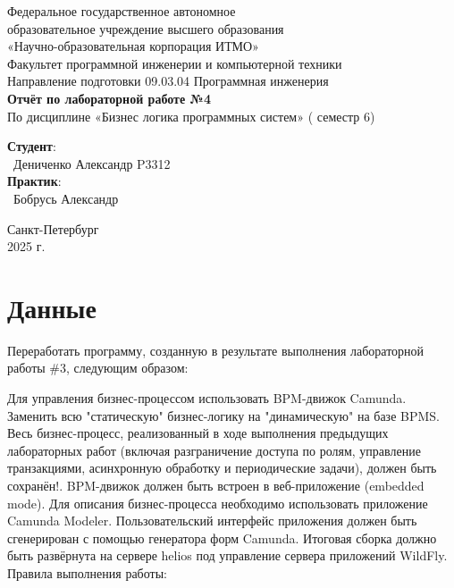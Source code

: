 \documentclass{article}
\begin{document}
\begin{center}
    \Large
    Федеральное государственное автономное \\
    образовательное учреждение высшего образования \\ 
    «Научно-образовательная корпорация ИТМО»\\
    \vspace{0.5cm}
    \large
    Факультет программной инженерии и компьютерной техники \\
    Направление подготовки 09.03.04 Программная инженерия \\
    \vspace{1cm}
    \Large
    \textbf{Отчёт по лабораторной работе №4} \\
        По дисциплине «Бизнес логика программных систем» ( семестр 6)\\
    \large
    \vspace{8cm}

    \begin{minipage}{.33\textwidth}
    \end{minipage}
    \hfill
    \begin{minipage}{.4\textwidth}
    
        \textbf{Студент}: \vspace{.1cm} \\
        \ Дениченко Александр P3312\\
        \textbf{Практик}:  \\
        \ Бобрусь Александр
    \end{minipage}
    \vfill
Санкт-Петербург\\ 2025 г.
\end{center}
\pagestyle{empty}
\newpage
\pagestyle{plain}

\section*{Данные}


Переработать программу, созданную в результате выполнения лабораторной работы \#3, следующим образом:

Для управления бизнес-процессом использовать BPM-движок Camunda.
Заменить всю "статическую" бизнес-логику на "динамическую" на базе BPMS. Весь бизнес-процесс, реализованный в ходе выполнения предыдущих лабораторных работ (включая разграничение доступа по ролям, управление транзакциями, асинхронную обработку и периодические задачи), должен быть сохранён!.
BPM-движок должен быть встроен в веб-приложение (embedded mode).
Для описания бизнес-процесса необходимо использовать приложение Camunda Modeler.
Пользовательский интерфейс приложения должен быть сгенерирован с помощью генератора форм Camunda.
Итоговая сборка должно быть развёрнута на сервере helios под управление сервера приложений WildFly.
Правила выполнения работы:
\end{document}
